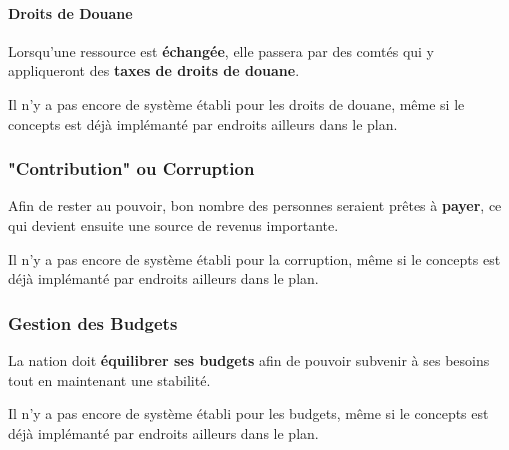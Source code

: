 \documentclass{article}
\newcommand*{\mybox}[2]{\colorbox{#1!30}{\parbox{.98\linewidth}{#2}}}
\newcommand\tab[1][0.5cm]{\hspace*{#1}}
\newcommand{\genbox}[1]{\mybox{verylightgray}{#1}}
\begin{document}
                \paragraph{Droits de Douane}
                    Lorsqu'une ressource est \textbf{échangée}, elle passera par des comtés qui y appliqueront des \textbf{taxes de droits de douane}. \\
                    
                    \tab \genbox{
                        Il n'y a pas encore de système établi pour les droits de douane, même si le concepts est déjà implémanté par endroits ailleurs dans le plan.
                    }

            \subsubsection{"Contribution" ou Corruption}
                Afin de rester au pouvoir, bon nombre des personnes seraient prêtes à \textbf{payer}, ce qui devient ensuite une source de revenus importante. \\
                
                \tab \genbox{
                        Il n'y a pas encore de système établi pour la corruption, même si le concepts est déjà implémanté par endroits ailleurs dans le plan.
                    }

            \subsubsection{Gestion des Budgets}
                La nation doit \textbf{équilibrer ses budgets} afin de pouvoir subvenir à ses besoins tout en maintenant une stabilité. \\

                \tab \genbox{
                        Il n'y a pas encore de système établi pour les budgets, même si le concepts est déjà implémanté par endroits ailleurs dans le plan.
                    }
\end{document}
